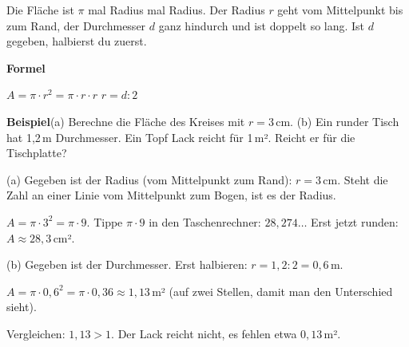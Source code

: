 \documentclass[11pt]{article}
\begin{document}
\clearpage\label{s:A}\noindent\colorbox{black!12}{}\hspace{3mm}{\Large\bfseries Fläche aus Radius oder Durchmesser}\par\smallskip
\noindent Die Fläche ist $\pi$ mal Radius mal Radius. Der Radius $r$ geht vom Mittelpunkt bis zum Rand, der Durchmesser $d$ ganz hindurch und ist doppelt so lang. Ist $d$ gegeben, halbierst du zuerst.\par\medskip
\noindent\textbf{Formel}\par\nopagebreak\noindent\hspace*{4mm}\begin{minipage}{\dimexpr\linewidth-4mm\relax}$A = \pi \cdot r^2 = \pi \cdot r \cdot r$ \qquad $r = d : 2$ \end{minipage}\par\medskip
\noindent\textbf{Beispiel}\quad (a) Berechne die Fläche des Kreises mit $r = 3$\,cm. (b) Ein runder Tisch hat 1,2\,m Durchmesser. Ein Topf Lack reicht für 1\,m². Reicht er für die Tischplatte?\par\smallskip
\noindent\begin{minipage}[t]{0.6\linewidth}\vspace{0pt}\par\noindent{}(a) Gegeben ist der Radius (vom Mittelpunkt zum Rand): $r = 3$\,cm. Steht die Zahl an einer Linie vom Mittelpunkt zum Bogen, ist es der Radius.\par\smallskip\par\noindent{}$A = \pi \cdot 3^2 = \pi \cdot 9$. Tippe $\pi \cdot 9$ in den Taschenrechner: $28{,}274\ldots$ Erst jetzt runden: $A \approx 28{,}3$\,cm².\par\smallskip\par\noindent{}(b) Gegeben ist der Durchmesser. Erst halbieren: $r = 1{,}2 : 2 = 0{,}6$\,m.\par\smallskip\par\noindent{}$A = \pi \cdot 0{,}6^2 = \pi \cdot 0{,}36 \approx 1{,}13$\,m² (auf zwei Stellen, damit man den Unterschied sieht).\par\smallskip\par\noindent{}Vergleichen: $1{,}13 > 1$. Der Lack reicht nicht, es fehlen etwa $0{,}13$\,m².\par\smallskip\end{minipage}\hfill
\end{document}
